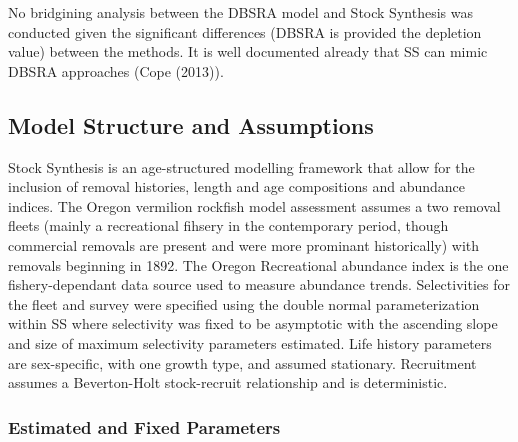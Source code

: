 \documentclass[11pt,
  english,
  a4paper,
]{article}
\begin{document}
\leavevmode\tagmcend\tagstructend


No bridgining analysis between the DBSRA model and Stock Synthesis was conducted given the significant differences (DBSRA is provided the depletion value) between the methods. It is well documented already that SS can mimic DBSRA approaches ({Cope (2013)\leavevmode\tagmcend\tagstructend}).

\leavevmode\tagmcend\tagstructend\par


\hypertarget{model-structure-and-assumptions}{%
\subsection{Model Structure and Assumptions}\label{model-structure-and-assumptions}}

\leavevmode\tagmcend\tagstructend


Stock Synthesis is an age-structured modelling framework that allow for the inclusion of removal histories, length and age compositions and abundance indices. The Oregon vermilion rockfish model assessment assumes a two removal fleets (mainly a recreational fihsery in the contemporary period, though commercial removals are present and were more prominant historically) with removals beginning in 1892. The Oregon Recreational abundance index is the one fishery-dependant data source used to measure abundance trends. Selectivities for the fleet and survey were specified using the double normal parameterization within SS where selectivity was fixed to be asymptotic with the ascending slope and size of maximum selectivity parameters estimated. Life history parameters are sex-specific, with one growth type, and assumed stationary. Recruitment assumes a Beverton-Holt stock-recruit relationship and is deterministic.

\leavevmode\tagmcend\tagstructend\par


\hypertarget{estimated-and-fixed-parameters}{%
\subsubsection{Estimated and Fixed Parameters}\label{estimated-and-fixed-parameters}}
\end{document}
